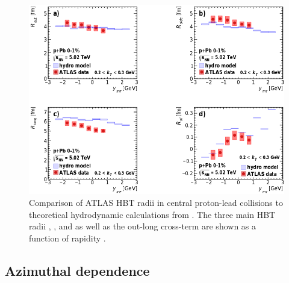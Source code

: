 \begin{figure}[t]
\centering
\includegraphics[width=\linewidth]{theory_bozek_kys.png}
\caption{Comparison of ATLAS HBT radii in central proton-lead collisions to theoretical hydrodynamic calculations from . The three main HBT radii \Rout, \Rside, and \Rlong as well as the out-long cross-term \Rol are shown as a function of rapidity \kys.}
\label{fig:results_theory_kys}
\end{figure}


\subsection{Azimuthal dependence}

